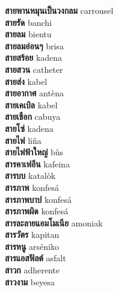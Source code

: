 \textbf{ สายพานหมุนเป็นวงกลม  } carrousel \\
\textbf{ สายรัด  } banchi \\
\textbf{ สายลม  } bientu \\
\textbf{ สายลมอ่อนๆ  } brisa \\
\textbf{ สายสร้อย  } kadena \\
\textbf{ สายสวน  } catheter \\
\textbf{ สายส่ง  } kabel \\
\textbf{ สายอากาศ  } antèna \\
\textbf{ สายเคเบิล  } kabel \\
\textbf{ สายเชือก  } cabuya \\
\textbf{ สายโซ่  } kadena \\
\textbf{ สายไฟ  } liña \\
\textbf{ สายไฟฟ้าใหญ่  } bùs \\
\textbf{ สารคาเฟอีน  } kafeina \\
\textbf{ สารบบ  } katalòk \\
\textbf{ สารภาพ  } konfesá \\
\textbf{ สารภาพบาป  } konfesá \\
\textbf{ สารภาพผิด  } konfesá \\
\textbf{ สารละลายแอมโมเนีย  } amoniak \\
\textbf{ สารวัตร  } kapitan \\
\textbf{ สารหนู  } arséniko \\
\textbf{ สารแอสฟัลต์  } asfalt \\
\textbf{ สาวก  } adherente \\
\textbf{ สาวงาม  } beyesa \\
